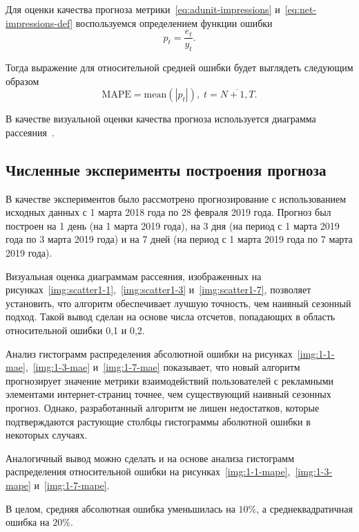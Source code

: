 Для оценки качества прогноза метрики~\eqref{eq:adunit-impressions} и~\eqref{eq:net-impressions-def} воспользуемся определением функции
ошибки
\begin{equation}
    p_t = \dfrac{e_t}{y_t}.
\end{equation}

Тогда выражение для относительной средней ошибки будет выглядеть следующим образом
\begin{equation}
    \text{MAPE} = \text{mean}\left( \left| p_t \right| \right),\; t = \overline{N+1, T}.
\end{equation}

В качестве визуальной оценки качества прогноза используется диаграмма рассеяния~\autocite{eval:scatter}.

\subsection{Численные эксперименты построения прогноза}

В качестве экспериментов было рассмотрено прогнозирование с использованием исходных 
данных с 1 марта 2018 года по 28 февраля 2019 года. Прогноз был построен на 1 день (на 1 марта 2019 года),
на 3 дня (на период с 1 марта 2019 года по 3 марта 2019 года) и на 7 дней (на период с 1 марта 2019 года
по 7 марта 2019 года).

Визуальная оценка диаграммам рассеяния, изображенных на рисунках~\ref{img:scatter1-1},~\ref{img:scatter1-3}
и~\ref{img:scatter1-7}, позволяет установить, что алгоритм обеспечивает лучшую точность,
чем наивный сезонный подход. Такой вывод сделан на основе числа отсчетов, попадающих в область 
относительной ошибки 0,1 и 0,2.
\medskip




\newpage
Анализ гистограмм распределения абсолютной ошибки на рисунках~\ref{img:1-1-mae},~\ref{img:1-3-mae} и~\ref{img:1-7-mae}
показывает, что новый алгоритм прогнозирует значение метрики взаимодействий пользователей с
рекламными элементами интернет-страниц точнее, чем существующий наивный сезонных прогноз. Однако,
разработанный алгоритм не лишен недостатков, которые подтверждаются растующие столбцы гистограммы
аболютной ошибки в некоторых случаях.




Аналогичный вывод можно сделать и на основе анализа гистограмм распределения относительной ошибки
на рисунках~\ref{img:1-1-mape},~\ref{img:1-3-mape} и~\ref{img:1-7-mape}.




В целом, средняя абсолютная ошибка уменьшилась на $10\%$, а среднеквадратичная ошибка на $20\%$.